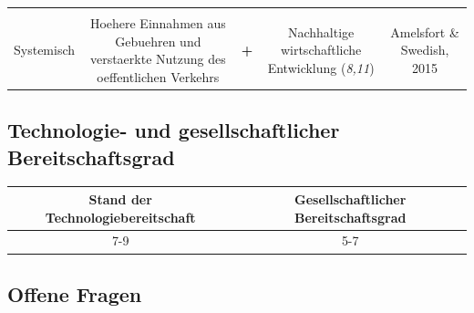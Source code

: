 \documentclass[
]{book}
\begin{document}
\begin{longtable}[]{@{}ccccc@{}}
\begin{minipage}[t]{0.17\columnwidth}
\end{minipage}\tabularnewline
\begin{minipage}[t]{0.17\columnwidth}\centering
Systemisch\strut
\end{minipage} & \begin{minipage}[t]{0.16\columnwidth}\centering
Hoehere Einnahmen aus Gebuehren und verstaerkte Nutzung des oeffentlichen Verkehrs\strut
\end{minipage} & \begin{minipage}[t]{0.17\columnwidth}\centering
\textbf{+}\strut
\end{minipage} & \begin{minipage}[t]{0.17\columnwidth}\centering
Nachhaltige wirtschaftliche Entwicklung (\emph{8,11})\strut
\end{minipage} & \begin{minipage}[t]{0.17\columnwidth}\centering
Amelsfort \& Swedish, 2015\strut
\end{minipage}\tabularnewline
\bottomrule
\end{longtable}

\hypertarget{technologie--und-gesellschaftlicher-bereitschaftsgrad-7}{%
\subsection*{Technologie- und gesellschaftlicher Bereitschaftsgrad}\label{technologie--und-gesellschaftlicher-bereitschaftsgrad-7}}

\begin{longtable}[]{@{}cc@{}}
\toprule
Stand der Technologiebereitschaft & Gesellschaftlicher Bereitschaftsgrad\tabularnewline
\midrule
\endhead
7-9 & 5-7\tabularnewline
\bottomrule
\end{longtable}

\hypertarget{offene-fragen-9}{%
\subsection*{Offene Fragen}\label{offene-fragen-9}}
\end{document}
